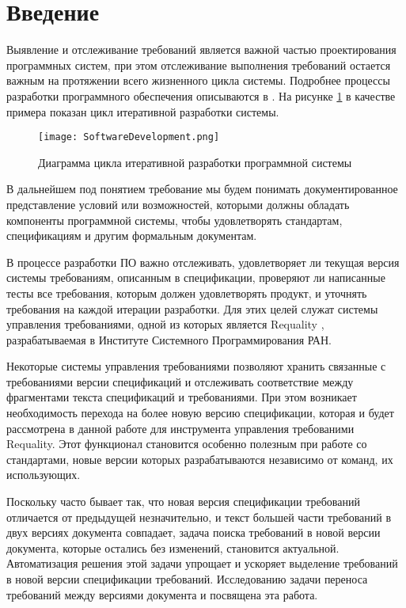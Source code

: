 \section{Введение}
\label{sec:Chapter1} 
Выявление и отслеживание требований является важной частью проектирования программных систем, при этом отслеживание выполнения требований остается важным на протяжении всего жизненного цикла системы. Подробнее процессы разработки программного обеспечения описываются в \cite{web:DevelopmentProcesses}. На рисунке \ref{intro:image1} в качестве примера показан цикл итеративной разработки системы.

\begin{figure}[h]
\begin{center}
\texttt{[image: SoftwareDevelopment.png]}
\caption{Диаграмма цикла итеративной разработки программной системы}
\label{intro:image1}
\end{center}
\end{figure}

В дальнейшем под понятием требование мы будем понимать документированное представление условий или возможностей, которыми должны обладать компоненты программной системы, чтобы удовлетворять стандартам, спецификациям и другим формальным документам. \cite{book:Requirements}

В процессе разработки ПО важно отслеживать, удовлетворяет ли текущая версия системы требованиям, описанным в спецификации, проверяют ли написанные тесты все требования, которым должен удовлетворять продукт, и уточнять требования на каждой итерации разработки. Для этих целей служат системы управления требованиями, одной из которых является Requality \cite{web:Requality}, разрабатываемая в Институте Системного Программирования РАН.

Некоторые системы управления требованиями позволяют хранить связанные с требованиями версии спецификаций и отслеживать соответствие между фрагментами текста спецификаций и требованиями. При этом возникает необходимость перехода на более новую версию спецификации, которая и будет рассмотрена в данной работе для инструмента управления требованими Requality. Этот функционал становится особенно полезным при работе со стандартами, новые версии которых разрабатываются независимо от команд, их использующих.

Поскольку часто бывает так, что новая версия спецификации требований отличается от предыдущей незначительно, и текст большей части требований в двух версиях документа совпадает, задача поиска требований в новой версии документа, которые остались без изменений, становится актуальной. Автоматизация решения этой задачи упрощает и ускоряет выделение требований в новой версии спецификации требований. Исследованию задачи переноса требований между версиями документа и посвящена эта работа.

